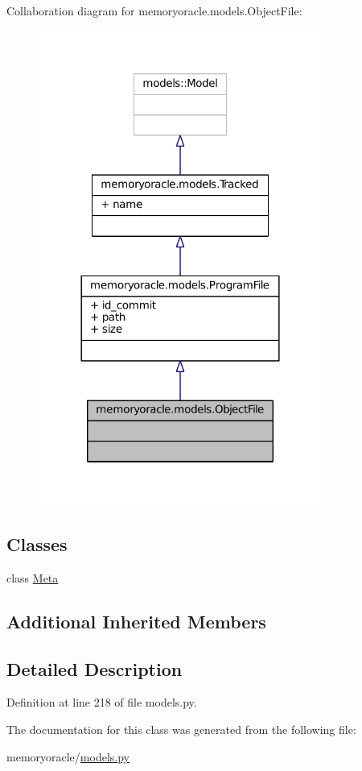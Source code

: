 Collaboration diagram for memoryoracle.\+models.\+Object\+File\+:\nopagebreak
\begin{figure}[H]
\begin{center}
\leavevmode
\includegraphics[width=264pt]{classmemoryoracle_1_1models_1_1ObjectFile__coll__graph}
\end{center}
\end{figure}
\subsection*{Classes}
\begin{DoxyCompactItemize}
\item 
class \hyperlink{classmemoryoracle_1_1models_1_1ObjectFile_1_1Meta}{Meta}
\end{DoxyCompactItemize}
\subsection*{Additional Inherited Members}


\subsection{Detailed Description}


Definition at line 218 of file models.\+py.



The documentation for this class was generated from the following file\+:\begin{DoxyCompactItemize}
\item 
memoryoracle/\hyperlink{models_8py}{models.\+py}\end{DoxyCompactItemize}
